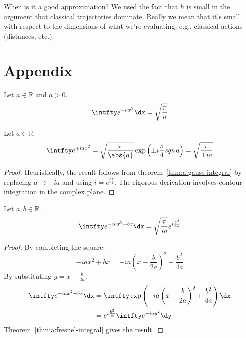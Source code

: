 \documentclass[a4paper]{extarticle}
\begin{document}
When is it a good approximation? We used the fact that $\hbar$ is small in the
argument that classical trajectories dominate. Really we mean that it's small
with respect to the dimensions of what we're evaluating, e.g., classical
actions (distances, etc.).

\section*{Appendix}

\begin{thm}
  \label{thm:a:gauss-integral}
  Let $a \in \mathbb{R}$ and $a > 0$.
  \begin{equation}
    \label{eqn:a:gauss-integral}
    \intfty e^{-ax^2} \dx = \sqrt{\frac{\pi}{a}}
  \end{equation}
\end{thm}

\begin{thm}
  \label{thm:a:fresnel-integral}
  Let $a \in \mathbb{R}$.
  \begin{equation}
    \label{eqn:a:fresnel-integral}
    \intfty e^{\mp iax^2}
    = \sqrt{\frac{\pi}{\abs{a}}} \exp\left(\pm i\frac{\pi}{4} \emph{sgn}\,a\right)
    = \sqrt{\frac{\pi}{\pm ia}}
  \end{equation}
  \begin{proof}
    Heuristically, the result follows from theorem~\ref{thm:a:gauss-integral} by
    replacing $a \to \pm ia$ and using $i = e^{i\frac{\pi}{2}}$.
    The rigorous derivation involves contour integration in the complex plane.
  \end{proof}
\end{thm}

\begin{thm}
  \label{thm:a:shifted-fresnel-integral}
  Let $a, b \in \mathbb{R}$.
  \begin{align}
    \label{eqn:a:shifted-fresnel-integral}
    \intfty e^{-iax^2 + bx} \dx = \sqrt{\frac{\pi}{ia}} e^{i \frac{b^2}{4a}}
  \end{align}
  \begin{proof}
    By completing the square:
    \begin{equation*}
      -iax^2 + bx = -ia\left(x - \frac{b}{2a}\right)^2 + \frac{b^2}{4a}
    \end{equation*}
    By substituting $y = x - \frac{b}{2a}$:
    \begin{align*}
      \intfty e^{-iax^2 + bx} \dx
       & = \intfty \exp\left(-ia\left(x - \frac{b}{2a}\right)^2 + \frac{b^2}{4a}\right) \dx \\
       & = e^{i \frac{b^2}{4a}} \intfty e^{-iay^2} \dy
    \end{align*}
    Theorem~\ref{thm:a:fresnel-integral} gives the result.
  \end{proof}
\end{thm}
\end{document}
